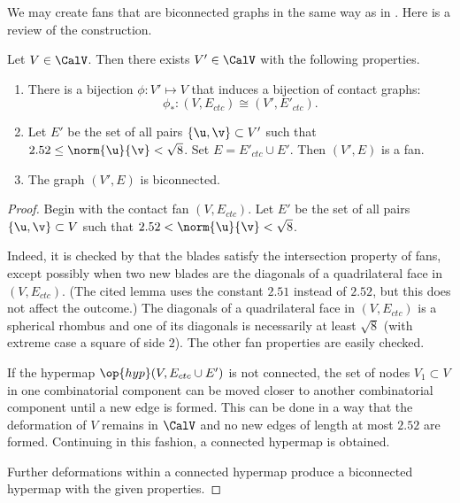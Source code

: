 We may create  fans that are biconnected graphs in the same way as in
\cite{Hales:2006:DCG}.  Here is a review
of the construction.



\begin{lemma}\label{lemma:V'-bi} 
Let $V\in \CalV$.  Then there exists $V'\in \CalV$ with
  the following properties.
\begin{enumerate}\wasitemize 
\item There is a bijection $\phi:V'\mapsto V$ that induces a bijection
  of contact graphs:
\[
\phi_*:(V,E_{ctc}) \cong (V',E'_{ctc}).
\]
\item Let $E'$ be the set of all pairs $\{\u,\v\}\subset V'$
  such that $2.52\le\norm{\u}{\v} <\sqrt8$.  Set $E =
  E'_{ctc}\cup E'$.  Then $(V',E)$ is a fan.
\item The graph $(V',E)$ is biconnected.
\end{enumerate}\wasitemize 
\end{lemma}

\begin{proof}
  Begin with the contact fan $(V,E_{ctc})$.  Let $E'$ be the set
  of all pairs $\{\u,\v\}\subset V$ such that
  $2.52<\norm{\u}{\v}<\sqrt8$.

   Indeed, it is checked by
  \cite[Lemma~4.30]{Hales:2006:DCG} that the blades satisfy the
  intersection property of fans, except possibly when two new blades
  are the diagonals of a quadrilateral face in $(V,E_{ctc})$.  (The
  cited lemma uses the constant $2.51$ instead of $2.52$, but this
  does not affect the outcome.)  The diagonals of a quadrilateral face
  in $(V,E_{ctc})$ is a spherical rhombus and one of its diagonals is
  necessarily at least $\sqrt8$ (with extreme case a square of side
  $2$).  The other fan properties are easily checked.

  If the hypermap $\op{hyp}(V,E_{ctc}\cup E')$ is not connected,
  the set of nodes $V_1\subset V$ in one combinatorial component can
  be moved closer to another combinatorial component until a new edge
  is formed.  This can be done in a way that the deformation of $V$
  remains in $\CalV$ and no new edges of length at most $2.52$ are formed.
  Continuing in this fashion, a connected hypermap is obtained.

  Further deformations within a connected hypermap produce a
  biconnected hypermap with the given properties.
\end{proof}


